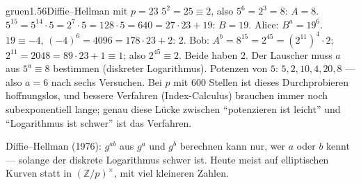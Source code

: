 \begin{loesungkarte}{gruen}{1.56}{Diffie--Hellman mit $p = 23$}
$5^{2} = 25\equiv2$, also $5^{6} = 2^{3} = 8$: $A = 8$. $5^{15} = 5^{14}\cdot5 = 2^{7}\cdot5 = 128\cdot5 = 640 = 27\cdot23 + 19$: $B = 19$.
Alice: $B^{a} = 19^{6}$. $19\equiv-4$, $(-4)^{6} = 4096 = 178\cdot23 + 2$: $2$. Bob: $A^{b} = 8^{15} = 2^{45} = (2^{11})^{4}\cdot2$; $2^{11} = 2048 = 89\cdot23 + 1\equiv1$; also $2^{45}\equiv2$. Beide haben $2$. \checkmark
{}
Der Lauscher muss $a$ aus $5^{a}\equiv8$ bestimmen (diskreter Logarithmus). Potenzen von $5$: $5, 2, 10, 4, 20, 8$ --- also $a = 6$ nach sechs Versuchen. Bei $p$ mit $600$ Stellen ist dieses Durchprobieren hoffnungslos, und bessere Verfahren (Index-Calculus) brauchen immer noch subexponentiell lange; genau diese Lücke zwischen \enquote{potenzieren ist leicht} und \enquote{Logarithmus ist schwer} ist das Verfahren.
\begin{mitnehmen}\kastentext
Diffie--Hellman (1976): $g^{ab}$ aus $g^{a}$ und $g^{b}$ berechnen kann nur, wer $a$ oder $b$ kennt --- solange der diskrete Logarithmus schwer ist. Heute meist auf elliptischen Kurven statt in $(\mathbb Z/p)^{\times}$, mit viel kleineren Zahlen.
\end{mitnehmen}
\end{loesungkarte}


